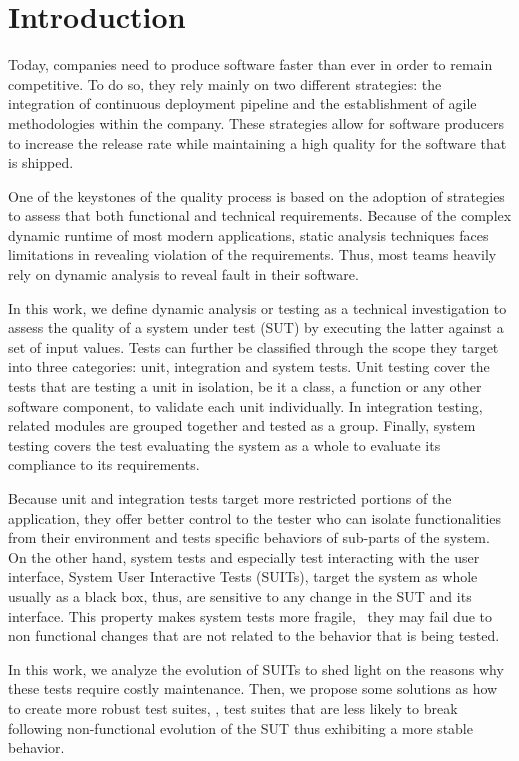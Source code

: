 \chapter{Introduction}

Today, companies need to produce software faster than ever in order to remain competitive. To do so, they rely mainly on two different strategies: the integration of continuous deployment pipeline and the establishment of agile methodologies within the company. These strategies allow for software producers to increase the release rate while maintaining a high quality for the software that is shipped.

One of the keystones of the quality process is based on the adoption of strategies to assess that both functional and technical requirements. Because of the complex dynamic runtime of most modern applications, static analysis techniques faces limitations in revealing violation of the requirements. Thus, most teams heavily rely on dynamic analysis to reveal fault in their software. 

In this work, we define dynamic analysis or testing as a technical investigation to assess the quality of a system under test (SUT) by executing the latter against a set of input values. Tests can further be classified through the scope they target into three categories: unit, integration and system tests. Unit testing cover the tests that are testing a unit in isolation, be it a class, a function or any other software component,  to validate each unit individually. In integration testing, related modules are grouped together and tested as a group. Finally, system testing covers the test evaluating the system as a whole to evaluate its compliance to its requirements.

Because unit and integration tests target more restricted portions of the application, they offer better control to the tester who can isolate functionalities from their environment and tests specific behaviors of sub-parts of the system. On the other hand, system tests and especially test interacting with the user interface, System User Interactive Tests (SUITs), target the system as whole usually as a black box, thus, are sensitive to any change in the SUT and its interface. This property makes system tests more fragile, \ie\ they may fail due to non functional changes that are not related to the behavior that is being tested.

In this work, we analyze the evolution of SUITs to shed light on the reasons why these tests require costly maintenance. Then, we propose some solutions as how to create more robust test suites, \ie, test suites that are less likely to break following non-functional evolution of the SUT thus exhibiting a more stable behavior.

